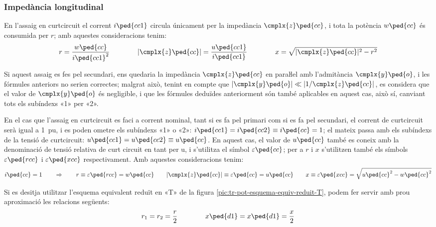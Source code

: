 \subsubsection{Impedància longitudinal}

En l'assaig en curtcircuit el corrent $i\ped{cc1}$ circula
únicament per la impedància $\cmplx{z}\ped{cc}$, i tota la potència
$w\ped{cc}$ és consumida per $r$; amb aquestes consideracions tenim:
\begin{equation}
    r = \frac{w\ped{cc}}{i\ped{cc1}^2} \qquad\qquad
    |\cmplx{z}\ped{cc}| = \frac{u\ped{cc1}}{i\ped{cc1}} \qquad\qquad
    x = \sqrt{|\cmplx{z}\ped{cc}|^2 - r^2}
\end{equation}

Si aquest assaig es fes pel secundari, ens quedaria la impedància
$\cmplx{z}\ped{cc}$ en paraŀlel amb l'admitància
$\cmplx{y}\ped{o}$, i les fórmules anteriors no serien
correctes; malgrat això, tenint en compte que $|\cmplx{y}\ped{o}| \ll
|1/\cmplx{z}\ped{cc}|$, es considera que el valor de
$\cmplx{y}\ped{o}$ és negligible, i que les fórmules deduïdes
anteriorment són també aplicables en aquest cas, això sí, canviant
tots els subíndexs «1» per «2».

En el cas que l'assaig en curtcircuit es faci a corrent nominal,
tant  si es fa pel primari  com si es fa pel secundari, el corrent
de curtcircuit serà igual a \qty{1}{pu}, i es poden ometre els
subíndexs «1» o «2»: $i\ped{cc1} = i\ped{cc2} \equiv i\ped{cc} = 1$;
el mateix passa amb els subíndexs de la tensió de curtcircuit:
$u\ped{cc1} = u\ped{cc2} \equiv u\ped{cc}$. En aquest cas, el valor
de $u\ped{cc}$ també es coneix amb la denominació de
tensió relativa de curt  circuit en tant per u, i s'utilitza  el
símbol $\varepsilon\ped{cc}$; per a $r$ i $x$ s'utilitzen també els
símbols $\varepsilon\ped{rcc}$ i $\varepsilon\ped{xcc}$
respectivament. Amb aquestes consideracions tenim:
\begin{equation}
    i\ped{cc} = 1 \qquad \Rightarrow \qquad r \equiv \varepsilon\ped{rcc} = w\ped{cc} \qquad
    |\cmplx{z}\ped{cc}| \equiv \varepsilon\ped{cc} = u\ped{cc} \qquad
    x \equiv \varepsilon\ped{xcc} = \sqrt{u\ped{cc}^2 - w\ped{cc}^2}
    \label{eq:assaig-cc-nomianl}
\end{equation}

Si es desitja utilitzar l'esquema equivalent reduït en «T» de la figura \vref{pic:tr-pot-esquema-equiv-reduit-T}, podem fer servir amb prou aproximació les relacions següents:
\begin{equation}
    r_1 = r_2 = \frac{r}{2} \qquad\qquad x\ped{d1} = x\ped{d1} = \frac{x}{2}
\end{equation}


